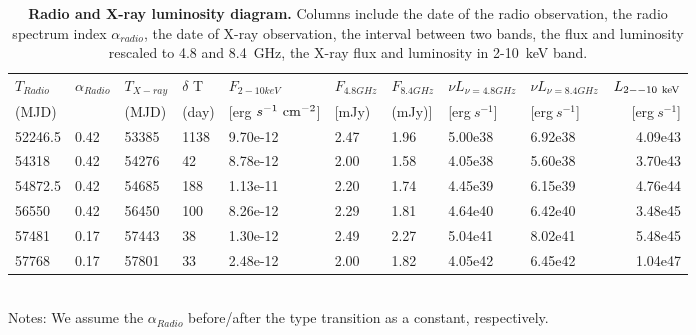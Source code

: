 \begin{table}
\centering
\caption{{\bf Radio and X-ray luminosity diagram.} Columns include the date of the radio observation, the radio spectrum index $\alpha_{radio}$, the date of X-ray observation, the interval between two bands, the flux and luminosity rescaled to 4.8 and 8.4~GHz, the X-ray flux and luminosity in 2-10~keV band.}
\label{tab:table4}
\begin{tabular}{lllllllllr}
\hline
\hline

$T_{Radio}$ &  $\alpha_{Radio}$ & $T_{X-ray}$ & $\delta$ T & $F_{2-10keV}$ & $F_{4.8GHz}$ & $F_{8.4GHz}$ &  $\nu L_{\nu=4.8GHz}$ &  $\nu L_{\nu=8.4GHz}$ & $L_{\rm{2--10~keV}}$ \\ 
(MJD)  &  & (MJD)  &(day)  &[erg$~s^{-1}~\rm{cm}^{-2}$] & [mJy)& (mJy)]& [erg$~s^{-1} $] & [erg$~s^{-1} $]& [erg$~s^{-1} $]\\
\hline

52246.5 & 0.42 & 53385 & 1138 & 9.70e-12 & 2.47 & 1.96 & 5.00e38 & 6.92e38 & 4.09e43 \\ 
54318 & 0.42 & 54276 & 42 & 8.78e-12 & 2.00 & 1.58 & 4.05e38 & 5.60e38 & 3.70e43 \\ 
54872.5 & 0.42 & 54685 & 188 & 1.13e-11 & 2.20 & 1.74 & 4.45e39 & 6.15e39 & 4.76e44 \\ 
56550 & 0.42 & 56450 & 100 & 8.26e-12 & 2.29 & 1.81 & 4.64e40 & 6.42e40 & 3.48e45 \\ 
57481 & 0.17 & 57443 & 38 & 1.30e-12 & 2.49 & 2.27 & 5.04e41 & 8.02e41 & 5.48e45 \\ 
57768 & 0.17 & 57801 & 33 & 2.48e-12 & 2.00 & 1.82 & 4.05e42 & 6.45e42 & 1.04e47 \\  \hline
\end{tabular}\\
Notes: We assume the $\alpha_{Radio}$ before/after the type transition as a constant, respectively. 
\end{table}